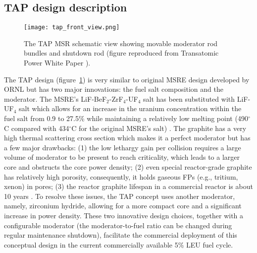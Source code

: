 \subsection{TAP design description}
\begin{figure}[h] %
	  		\hspace{+2.2in}
	\texttt{[image: tap\_front\_view.png]}
	\caption{The \gls{TAP} \gls{MSR} schematic view showing movable moderator 
		rod 
		bundles and shutdown rod (figure reproduced from Transatomic Power 
		White Paper 
		\cite{transatomic_power_corporation_technical_2016}).}
	\label{fig:tap-main-view}
\end{figure}
The \gls{TAP} design (figure~\ref{fig:tap-main-view}) is very similar to 
original \gls{MSRE} design developed by \gls{ORNL} 
\cite{haubenreich_experience_1970} but has two major innovations: 
the fuel salt composition and the moderator. The \gls{MSRE}'s 
LiF-BeF$_2$-ZrF$_4$-UF$_4$ salt has been substituted with LiF-UF$_4$ salt 
which allows for an increase in the uranium concentration within the fuel salt 
from 0.9 to 27.5\% while maintaining a relatively low melting point 
(490$^{\circ}$C compared with 434$^{\circ}$C for the original \gls{MSRE}'s 
salt) \cite{betzler_two-dimensional_2016}. The graphite has a very high 
thermal scattering cross section which makes it a perfect moderator but has 
a few major drawbacks: 
(1) the low lethargy gain per collision requires a large volume of moderator 
to be present to reach criticality, which leads to a larger core and obstructs 
the core power density; (2) even special 
reactor-grade graphite has relatively high porosity, consequently, it holds
gaseous \glspl{FP} 
(e.g., tritium, xenon) in pores; (3) the reactor graphite lifespan in a 
commercial 
reactor is about 10 years \cite{robertson_conceptual_1971}. To resolve these 
issues, the \gls{TAP} concept uses another 
moderator, namely, zirconium hydride, allowing for a more compact core and a 
significant increase in power density. These two innovative design choices,  
together with a configurable moderator 
(the moderator-to-fuel ratio can be changed during regular maintenance 
shutdown), 
facilitate the commercial deployment of this conceptual design in the current 
commercially available 5\% \gls{LEU} fuel cycle. 

